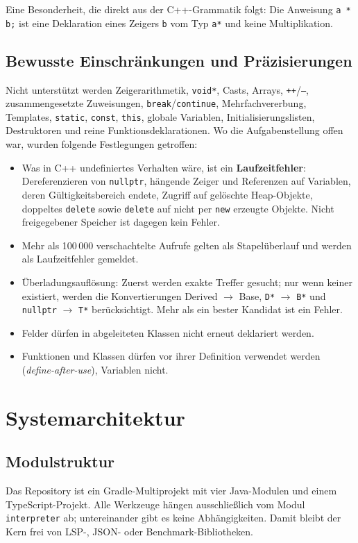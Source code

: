 \documentclass[11pt,a4paper,parskip=half,headsepline,toc=flat]{scrartcl}
\newcommand{\code}[1]{\texttt{#1}}
\begin{document}
Eine Besonderheit, die direkt aus der C++-Grammatik folgt: Die Anweisung \code{a * b;} ist eine Deklaration eines
Zeigers \code{b} vom Typ \code{a*} und keine Multiplikation.

\subsection{Bewusste Einschränkungen und Präzisierungen}
Nicht unterstützt werden Zeigerarithmetik, \code{void*}, Casts, Arrays, \code{++}/\code{--}, zusammengesetzte
Zuweisungen, \code{break}/\code{continue}, Mehrfachvererbung, Templates, \code{static}, \code{const}, \code{this},
globale Variablen, Initialisierungslisten, Destruktoren und reine Funktionsdeklarationen. Wo die Aufgabenstellung
offen war, wurden folgende Festlegungen getroffen:
\begin{itemize}
  \item Was in C++ undefiniertes Verhalten wäre, ist ein \textbf{Laufzeitfehler}: Dereferenzieren von
    \code{nullptr}, hängende Zeiger und Referenzen auf Variablen, deren Gültigkeitsbereich endete, Zugriff auf
    gelöschte Heap-Objekte, doppeltes \code{delete} sowie \code{delete} auf nicht per \code{new} erzeugte Objekte.
    Nicht freigegebener Speicher ist dagegen kein Fehler.
  \item Mehr als 100\,000 verschachtelte Aufrufe gelten als Stapelüberlauf und werden als Laufzeitfehler gemeldet.
  \item Überladungsauflösung: Zuerst werden exakte Treffer gesucht; nur wenn keiner existiert, werden die
    Konvertierungen Derived $\rightarrow$ Base, \code{D*} $\rightarrow$ \code{B*} und \code{nullptr} $\rightarrow$
    \code{T*} berücksichtigt. Mehr als ein bester Kandidat ist ein Fehler.
  \item Felder dürfen in abgeleiteten Klassen nicht erneut deklariert werden.
  \item Funktionen und Klassen dürfen vor ihrer Definition verwendet werden (\emph{define-after-use}), Variablen
    nicht.
\end{itemize}

\section{Systemarchitektur}\label{sec:architektur}
\subsection{Modulstruktur}
Das Repository ist ein Gradle-Multiprojekt mit vier Java-Modulen und einem TypeScript-Projekt. Alle Werkzeuge hängen
ausschließlich vom Modul \code{interpreter} ab; untereinander gibt es keine Abhängigkeiten. Damit bleibt der Kern frei
von LSP-, JSON- oder Benchmark-Bibliotheken.
\end{document}
